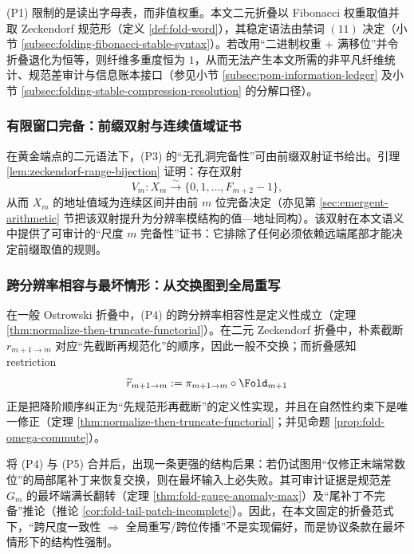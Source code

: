 \begin{remark}[二元读出不等于二进制权重]\label{rem:protocol-binary-not-base2}
(P1) 限制的是读出字母表，而非值权重。本文二元折叠以 Fibonacci 权重取值并取 Zeckendorf 规范形（定义 \ref{def:fold-word}），其稳定语法由禁词 \((11)\) 决定（小节 \ref{subsec:folding-fibonacci-stable-syntax}）。若改用“二进制权重 + 满移位”并令折叠退化为恒等，则纤维多重度恒为 \(1\)，从而无法产生本文所需的非平凡纤维统计、规范差审计与信息账本接口（参见小节 \ref{subsec:pom-information-ledger} 及小节 \ref{subsec:folding-stable-compression-resolution} 的分解口径）。
\end{remark}

\subsubsection{有限窗口完备：前缀双射与连续值域证书}
在黄金端点的二元语法下，(P3) 的“无孔洞完备性”可由前缀双射证书给出。引理 \ref{lem:zeckendorf-range-bijection} 证明：存在双射
\[
V_m:X_m\overset{\sim}{\longrightarrow}\{0,1,\dots,F_{m+2}-1\},
\]
从而 \(X_m\) 的地址值域为连续区间并由前 \(m\) 位完备决定（亦见第 \ref{sec:emergent-arithmetic} 节把该双射提升为分辨率模结构的值—地址同构）。该双射在本文语义中提供了可审计的“尺度 \(m\) 完备性”证书：它排除了任何必须依赖远端尾部才能决定前缀取值的规则。

\subsubsection{跨分辨率相容与最坏情形：从交换图到全局重写}
在一般 Ostrowski 折叠中，(P4) 的跨分辨率相容性是定义性成立（定理 \ref{thm:normalize-then-truncate-functorial}）。在二元 Zeckendorf 折叠中，朴素截断 \(r_{m+1\to m}\) 对应“先截断再规范化”的顺序，因此一般不交换；而折叠感知 restriction
\[
\widetilde r_{m+1\to m}:=\pi_{m+1\to m}\circ \Fold_{m+1}
\]
正是把降阶顺序纠正为“先规范形再截断”的定义性实现，并且在自然性约束下是唯一修正（定理 \ref{thm:normalize-then-truncate-functorial}；并见命题 \ref{prop:fold-omega-commute}）。\par
将 (P4) 与 (P5) 合并后，出现一条更强的结构后果：若仍试图用“仅修正末端常数位”的局部尾补丁来恢复交换，则在最坏输入上必失败。其可审计证据是规范差 \(G_m\) 的最坏端满长翻转（定理 \ref{thm:fold-gauge-anomaly-max}）及“尾补丁不完备”推论（推论 \ref{cor:fold-tail-patch-incomplete}）。因此，在本文固定的折叠范式下，“跨尺度一致性 \(\Rightarrow\) 全局重写/跨位传播”不是实现偏好，而是协议条款在最坏情形下的结构性强制。

